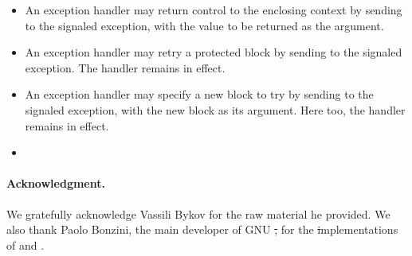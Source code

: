 \documentclass[a4paper,10pt,twoside]{book}
\begin{document}
\begin{itemize}
\item An exception handler may return control to the enclosing context by sending  to the signaled exception, with the value to be returned as the argument.

\item An exception handler may retry a protected block by sending  to the signaled exception. The handler remains in effect.

\item An exception handler may specify a new block to try by sending  to the signaled exception, with the new block as its argument. Here too, the handler remains in effect.


\item {}

\end{itemize}

\paragraph{Acknowledgment.}  We gratefully acknowledge Vassili Bykov for the raw material he provided. We also thank Paolo Bonzini, the main developer of GNU \st, for the \st implementations of  and .

\ifx\wholebook\relax\else
   
   
\end{document}
